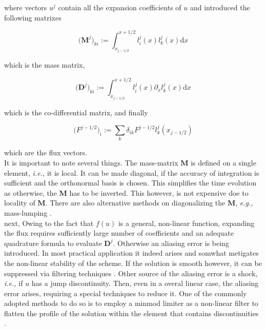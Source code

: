 where vectors $u^{j}$ contain all the expansion coefficients of $u$ and introduced the following matrixes

\begin{equation}
\big(\boldsymbol{M}^j\big)_{ki} := \int_{x_{j-1/2}}^{x+1/2}l_{i}^{j}(x)l_{k}^{j}(x)\text{d}x
\end{equation}

which is the mass matrix, 

\begin{equation}
\big(\boldsymbol{D}^{j}\big)_{ki} := \int_{x_{j-1/2}}^{x+1/2}l_{i}^{j}(x)\partial_{x}l_{k}^{j}(x)\text{d}x
\end{equation}

which is the co-differential matrix, and finally 

\begin{equation}
\big(F^{j-1/2}\big)_i := \sum_{k} \delta_{ik} F^{j-1/2}l_{k}^{j}(x_{j-1/2})
\end{equation}

which are the flux vectors.\\

It is important to note several things. The mass-matrix $\boldsymbol{M}$ is defined on a single element, \textit{i.e.,} it is local. It can be made diagonal, if the accuracy of integration is sufficient and the orthonormal basis is chosen. This simplifies the time evolution as otherwise, the $\boldsymbol{M}$ has to be inverted. This however, is not expensive doe to locality of $\boldsymbol{M}$. There are also alternative methods on diagonalizing the $\boldsymbol{M}$, \textit{e.g.,} mass-lumping \cite{Canuto:2008}.  \\

next, Owing to the fact that $f(u)$ is a general, non-linear function, expanding the flux requires sufficiently large number of coefficients and an adequate quadrature formula to evaluate $\boldsymbol{D}^j$. Otherwise an aliasing error is being introduced. In most practical application it indeed arises and somwhat metigates the non-linear stability of the scheme. If the solution is smooth however, it can be suppressed via filtering techniques \cite{Hesthaven:2007}. 
Other source of the aliasing error is a shock, \textit{i.e.,} if $u$ has a jump discontinuity. Then, even in a overal linear case, the aliasing error arises, requiring a special techniques to reduce it. One of the commonly adopted methods to do so is to employ a minmod limiter as a non-linear filter to flatten the profile of the solution within the element that contains discontinuities \cite{Cockburn:2001}.